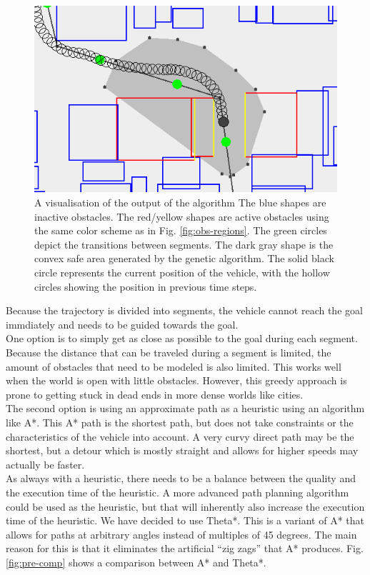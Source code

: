 \begin{figure}[!t]
    \centering
        \includegraphics[width=0.8\columnwidth]{img/pre-full}
    \caption{A visualisation of the output of the algorithm The blue shapes are inactive obstacles. The red/yellow shapes are active obstacles using the same color scheme as in Fig. \ref{fig:obs-regions}. The green circles depict the transitions between segments. The dark gray shape is the convex safe area generated by the genetic algorithm. The solid black circle represents the current position of the vehicle, with the hollow circles showing the position in previous time steps.}\label{fig:pre-full}
\end{figure}
Because the trajectory is divided into segments, the vehicle cannot reach the goal immdiately and needs to be guided towards the goal.\\
One option is to simply get as close as possible to the goal during each segment. Because the distance that can be traveled during a segment is limited, the amount of obstacles that need to be modeled is also limited. This works well when the world is open with little obstacles. However, this greedy approach is prone to getting stuck in dead ends in more dense worlds like cities.\\
The second option is using an approximate path as a heuristic using an algorithm like A*. This A* path is the shortest path, but does not take constraints or the characteristics of the vehicle into account. A very curvy direct path may be the shortest, but a detour which is mostly straight and allows for higher speeds may actually be faster. \\
As always with a heuristic, there needs to be a balance between the quality and the execution time of the heuristic. A more advanced path planning algorithm could be used as the heuristic, but that will inherently also increase the execution time of the heuristic. We have decided to use Theta*. This is a variant  of A* that allows for paths at arbitrary angles instead of multiples of 45 degrees. The main reason for this is that it eliminates the artificial ``zig zags'' that A* produces. Fig. \ref{fig:pre-comp} shows a comparison between A* and Theta*.

